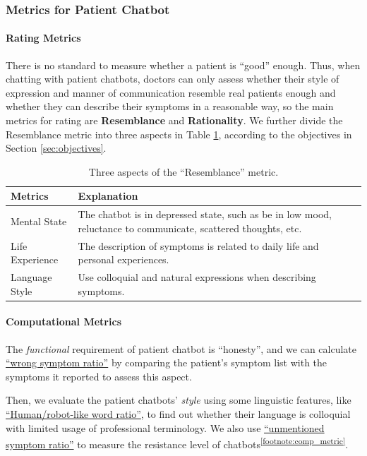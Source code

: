 \subsubsection{Metrics for Patient Chatbot}
\paragraph{Rating Metrics}
There is no standard to measure whether a patient is ``good'' enough. Thus, when chatting with patient chatbots, doctors can only assess whether their style of expression and manner of communication resemble real patients enough and whether they can describe their symptoms in a reasonable way, so the main metrics for rating are \textbf{Resemblance} and \textbf{Rationality}.
We further divide the Resemblance metric into three aspects in Table \ref{tab:human_eval_patient}, according to the objectives in Section \ref{sec:objectives}.

\begin{table}[h]
    \centering
    \footnotesize
    \begin{tabular}{m{}|m{}}
    \hline
    Metrics & Explanation \\
    \hline
    Mental State & The chatbot is in depressed state, such as be in low mood, reluctance to communicate, scattered thoughts, etc.\\
    \hline
    Life Experience & The description of symptoms is related to daily life and personal experiences.\\
    \hline
    Language Style & Use colloquial and natural expressions when describing symptoms.\\
    \hline
    \end{tabular}
    \caption{Three aspects of the ``Resemblance'' metric.}
    \label{tab:human_eval_patient}
\end{table}
\paragraph{Computational Metrics}
The \textit{functional} requirement of patient chatbot is ``honesty'', and we can calculate \uline{``wrong symptom ratio''} by comparing the patient's symptom list with the symptoms it reported to assess this aspect. 

Then, we evaluate the patient chatbots' \textit{style} using some linguistic features, like \uline{``Human/robot-like word ratio''}, to find out whether their language is colloquial with limited usage of professional terminology. We also use \uline{``unmentioned symptom ratio''} to measure the resistance level of chatbots\textsuperscript{\ref{footnote:comp_metric}}. 

